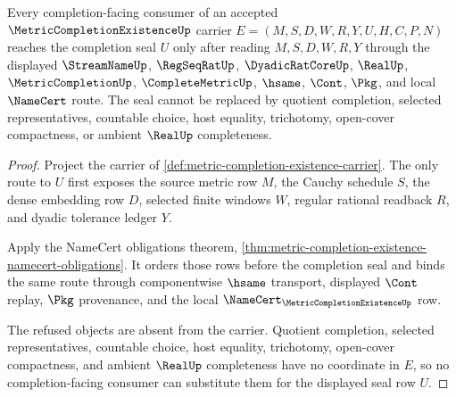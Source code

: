 \begin{theorem}
\label{thm:metric-completion-existence-completion-seal-nonescape}
Every completion-facing consumer of an accepted $\MetricCompletionExistenceUp$ carrier $E=(M,S,D,W,R,Y,U,H,C,P,N)$ reaches the completion seal $U$ only after reading $M,S,D,W,R,Y$ through the displayed $\StreamNameUp$, $\RegSeqRatUp$, $\DyadicRatCoreUp$, $\RealUp$, $\MetricCompletionUp$, $\CompleteMetricUp$, $\hsame$, $\Cont$, $\Pkg$, and local $\NameCert$ route. The seal cannot be replaced by quotient completion, selected representatives, countable choice, host equality, trichotomy, open-cover compactness, or ambient $\RealUp$ completeness.
\end{theorem}
\begin{proof}
Project the carrier of \autoref{def:metric-completion-existence-carrier}. The only route to $U$ first exposes the source metric row $M$, the Cauchy schedule $S$, the dense embedding row $D$, selected finite windows $W$, regular rational readback $R$, and dyadic tolerance ledger $Y$.

Apply the NameCert obligations theorem, \autoref{thm:metric-completion-existence-namecert-obligations}. It orders those rows before the completion seal and binds the same route through componentwise $\hsame$ transport, displayed $\Cont$ replay, $\Pkg$ provenance, and the local $\NameCert_{\MetricCompletionExistenceUp}$ row.

The refused objects are absent from the carrier. Quotient completion, selected representatives, countable choice, host equality, trichotomy, open-cover compactness, and ambient $\RealUp$ completeness have no coordinate in $E$, so no completion-facing consumer can substitute them for the displayed seal row $U$.
\end{proof}


